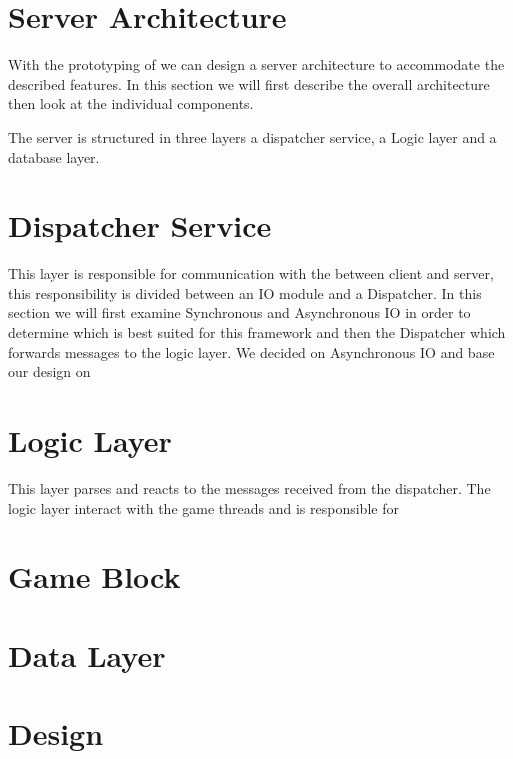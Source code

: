 \section{Server Architecture}
\label{sec:server}
With the prototyping of  we can design a server architecture to accommodate the described features. In this section we will first describe the overall architecture then look at the individual components.


The server is structured in three layers a dispatcher service, a Logic layer and a database layer. 




\section{Dispatcher Service}
This layer is responsible for communication with the between client and server, this responsibility is divided between an IO module and a Dispatcher. In this section we will first examine Synchronous and Asynchronous IO in order to determine which is best suited for this framework and then the Dispatcher which forwards messages to the logic layer. We decided on Asynchronous IO and base our design on \cite{?} 	 %







\section{Logic Layer}
This layer parses and reacts to the messages received from the dispatcher. The logic layer interact with the game threads and is responsible for 




\section{Game Block}

\section{Data Layer}



\section{Design}